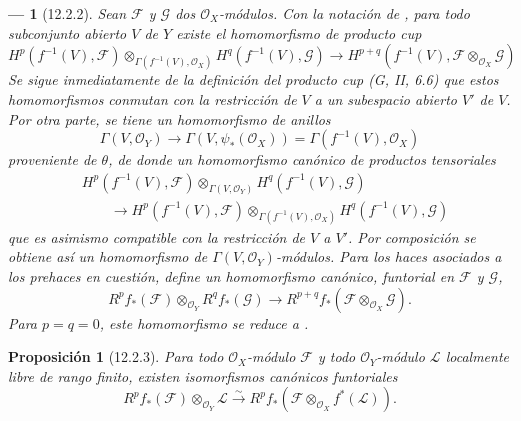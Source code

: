 \documentclass[10pt,oneside,openany]{book}
\theoremstyle{egaenv}\newtheorem*{env}{---}
\theoremstyle{egastatement}
\newtheorem*{proposition}{Proposición}
\theoremstyle{egadescription}
\newcommand{\oldpage}[2][]{\marginnote{\normalfont\scriptsize\textbf{#1}\,|\,#2}\ignorespaces}
\begin{document}
\begin{env}[12.2.2]
\label{0.12.2.2}
\label{0.12.2.2-fr}
Sean $\mathcal F$ y $\mathcal G$ dos $\mathcal O_X$-módulos.
Con la notación de , para todo subconjunto abierto $V$ de
$Y$ existe el homomorfismo de producto cup 
\[
H^p(f^{-1}(V),\mathcal F)
\otimes_{\Gamma(f^{-1}(V),\mathcal O_X)}
H^q(f^{-1}(V),\mathcal G)
\longrightarrow
H^{p+q}(f^{-1}(V),\mathcal F\otimes_{\mathcal O_X}\mathcal G)
\]
\oldpage[0\textsubscript{III}]{58}
Se sigue inmediatamente de la definición del producto cup
(G, II, 6.6) que estos homomorfismos conmutan con la restricción de
$V$ a un subespacio abierto $V'$ de $V$. Por otra parte, se tiene un homomorfismo de anillos
\[
\Gamma(V,\mathcal O_Y)\longrightarrow\Gamma(V,\psi_*(\mathcal O_X))
=\Gamma(f^{-1}(V),\mathcal O_X)
\]
proveniente de $\theta$, de donde un homomorfismo canónico de productos tensoriales
\[
\begin{aligned}
&H^p(f^{-1}(V),\mathcal F)\otimes_{\Gamma(V,\mathcal O_Y)}
H^q(f^{-1}(V),\mathcal G)\\
&\qquad\longrightarrow
H^p(f^{-1}(V),\mathcal F)
\otimes_{\Gamma(f^{-1}(V),\mathcal O_X)}
H^q(f^{-1}(V),\mathcal G)
\end{aligned}
\]
que es asimismo compatible con la restricción de $V$ a $V'$.
Por composición se obtiene así un homomorfismo de
$\Gamma(V,\mathcal O_Y)$-módulos.  Para los haces asociados a los
prehaces en cuestión, define un homomorfismo canónico,
funtorial en $\mathcal F$ y $\mathcal G$,
\[
\label{0.12.2.2.1-fr}
\tag{12.2.2.1}
R^p f_*(\mathcal F)\otimes_{\mathcal O_Y}R^q f_*(\mathcal G)
\longrightarrow
R^{p+q}f_*(\mathcal F\otimes_{\mathcal O_X}\mathcal G).
\]
Para $p=q=0$, este homomorfismo se reduce a
.
\end{env}

\begin{proposition}[12.2.3]
\label{0.12.2.3}
\label{0.12.2.3-fr}
Para todo $\mathcal O_X$-módulo $\mathcal F$ y todo $\mathcal O_Y$-módulo
$\mathcal L$ localmente libre de rango finito, existen isomorfismos canónicos
funtoriales
\[
\label{0.12.2.3.1-fr}
\tag{12.2.3.1}
R^p f_*(\mathcal F)\otimes_{\mathcal O_Y}\mathcal L
\xrightarrow{\sim}
R^p f_*(\mathcal F\otimes_{\mathcal O_X}f^*(\mathcal L)).
\]
\end{proposition}
\end{document}
